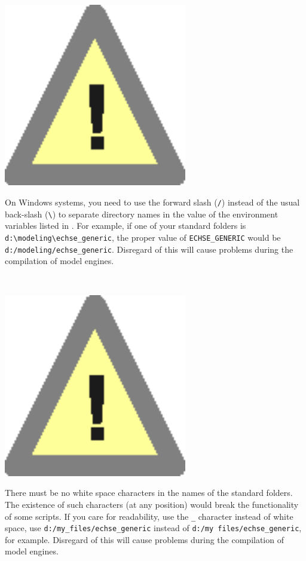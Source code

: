 \begin{minipage}{0.15\textwidth}
  \includegraphics[width=0.6\textwidth]{../../_common/fig/symbols_warning.eps}   
\end{minipage}
\begin{minipage}{0.8\textwidth}
On Windows systems, you need to use the forward slash (\verb!/!) instead of the usual back-slash (\verb!\!) to separate directory names in the value of the environment variables listed in . For example, if one of your  standard folders is \verb!d:\modeling\echse_generic!, the proper value of \verb!ECHSE_GENERIC! would be \verb!d:/modeling/echse_generic!. Disregard of this will cause problems during the compilation of model engines.
\end{minipage} \\

\begin{minipage}{0.15\textwidth}
  \includegraphics[width=0.6\textwidth]{../../_common/fig/symbols_warning.eps}   
\end{minipage}
\begin{minipage}{0.8\textwidth}
There must be no white space characters in the names of the  standard folders. The existence of such characters (at any position) would break the functionality of some scripts. If you care for readability, use the \verb!_! character instead of white space, \ie{} use \verb!d:/my_files/echse_generic! instead of \verb!d:/my files/echse_generic!, for example. Disregard of this will cause problems during the compilation of model engines.
\end{minipage} \\

